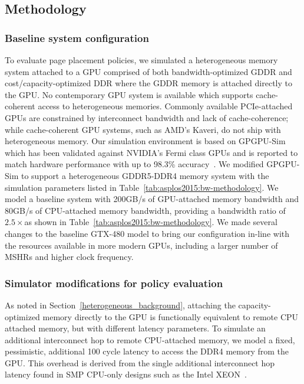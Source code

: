 \subsection{Methodology}
\label{chap:asplos2015:methodology}
\subsubsection{Baseline system configuration}
\label{chap:asplos2015:baseline-methodology}
To evaluate page placement policies, we simulated a heterogeneous memory system
attached to a GPU comprised of both bandwidth-optimized GDDR and
cost/capacity-optimized DDR where the GDDR memory is attached directly to the
GPU\@.
No contemporary GPU system is available which supports cache-coherent access to
heterogeneous memories.  Commonly available PCIe-attached GPUs are constrained
by interconnect bandwidth and lack of cache-coherence; while cache-coherent GPU
systems, such as AMD's Kaveri, do not ship with heterogeneous memory.  Our
simulation environment is based on GPGPU-Sim~\cite{gpgpusimIspass09} which has
been validated against NVIDIA's Fermi class GPUs and is reported to match
hardware performance with up to 98.3\% accuracy~\cite{gpgpusimManual}.  We
modified GPGPU-Sim to support a heterogeneous GDDR5-DDR4 memory system with the
simulation parameters listed in Table~\ref{tab:asplos2015:bw-methodology}.
We model a baseline system with 200GB/s of GPU-attached memory bandwidth and
80GB/s of CPU-attached memory bandwidth, providing a bandwidth ratio of
$2.5\times$\@ as shown in Table~\ref{tab:asplos2015:bw-methodology}.
We made several changes to the baseline GTX-480 model to bring our
configuration in-line with the resources available in more modern GPUs,
including a larger number of MSHRs and higher clock frequency.

\subsubsection{Simulator modifications for policy evaluation}
As noted in Section~\ref{heterogeneous_background}, attaching the capacity-optimized memory
directly to the GPU is functionally equivalent to remote CPU attached memory,
but with different latency parameters.  To simulate an additional interconnect hop
to remote CPU-attached memory, we model a fixed, pessimistic, additional 100 cycle latency to access
the DDR4 memory from the GPU\@. This overhead is derived from the single additional interconnect
hop latency found in SMP CPU-only designs such as the Intel XEON~\cite{INTELXEON}\@.


